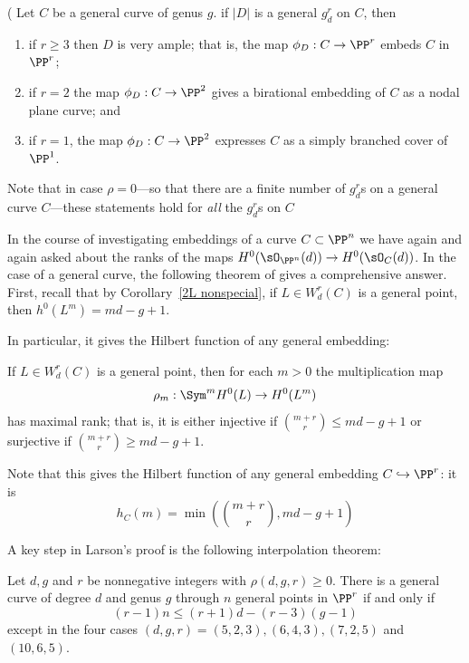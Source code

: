 \begin{theorem}\label{grd omnibus}(\cite[Proposition 5.4]{Eisenbud-Harris83}
Let $C$ be a general curve of genus $g$.
 if $|D|$ is a general $g^r_d$ on $C$, then

 \begin{enumerate}
\item if $r \geq 3$ then $D$ is very ample; that is, the map $\phi_D : C \to \PP^r$   embeds $C$ in $\PP^r$;
\item if $r=2$ the map $\phi_D : C \to \PP^2$ gives a birational embedding of $C$ as a nodal plane curve; and 
\item if $r=1$, the map $\phi_D : C \to \PP^2$ expresses $C$ as a simply branched cover of $\PP^1$.
\end{enumerate}
\end{theorem}

Note that in case $\rho = 0$---so that there are a finite number of $g^r_d$s on a general curve $C$---these statements hold for \emph{all} the $g^r_d$s on $C$

In the course of investigating embeddings of a curve $C\subset \PP^n$ we have again and again
asked about the ranks of the maps $H^0(\sO_{\PP^n}(d)) \to H^0(\sO_C(d))$. In the case of
a general curve, the following theorem of \cite{ELarson2018} gives a comprehensive answer. First, recall that by Corollary~\ref{2L nonspecial}, if $L \in W^r_d(C)$ is a general point, then $h^0(L^m) = md-g+1$.

In particular, it gives
 the Hilbert function of any general embedding:
 
\begin{theorem}\label{maximal rank}
If $L \in W^r_d(C)$ is a general point, then for each $m > 0$ the multiplication map
$$
\rho_m : \Sym^m H^0(L) \to H^0(L^m)
$$
has maximal rank; that is, it is either injective if $\binom{m+r}{r} \leq md-g+1$ or surjective if $\binom{m+r}{r} \geq md-g+1$.
\end{theorem}


Note that this gives
 the Hilbert function of any general embedding $C \hookrightarrow \PP^r$: it is 
 $$
 h_C(m) = \min(\binom{m+r}{r} , md-g+1)
 $$
 


A key step in Larson's proof is the following interpolation theorem:

\begin{theorem}\label{Larson-Vogt}
Let $d, g$ and $r$
be nonnegative integers with $\rho(d, g, r) \geq 0$. There is a general curve of degree $d$ and genus $g$ through $n$ general
points in $\PP^r$
if and only if
$$
(r-1)n \leq (r + 1)d-(r-3)(g-1)
$$
except in the four cases $(d, g, r) = (5, 2, 3),(6, 4, 3),(7, 2, 5)$ and $(10, 6, 5)$.

 \end{theorem}
 
